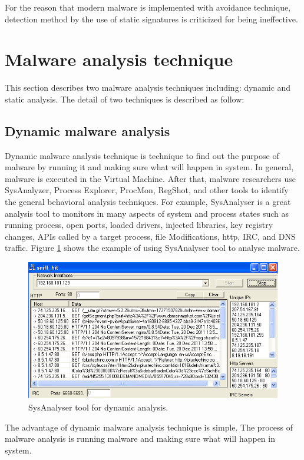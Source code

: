 For the reason that modern malware is implemented with avoidance technique, detection method by the use of static signatures is criticized for being ineffective.   
\section{Malware analysis technique}
This section describes two malware analysis techniques including: dynamic and static analysis. The detail of two techniques is described as follow: 
\subsection{Dynamic malware analysis}
Dynamic malware analysis technique is technique to find out the purpose of malware by running it and making sure what will happen in system. In general, malware is executed in the Virtual Machine. After that, malware researchers use SysAnalyzer, Process Explorer, ProcMon, RegShot, and other tools to identify the general behavioral analysis techniques. For example, SysAnalyser is a great analysis tool to monitors in many aspects of system and process states such as running process, open ports, loaded drivers, injected libraries, key registry changes, APIs called by a target process, file Modifications, http, IRC, and DNS traffic. Figure \ref{fig:SysAnalyser} shows the example of using SysAnalyser tool to analyse malware. 


\begin{figure}[h!]
\centering
\includegraphics[width=1\textwidth]{graph/SysAnalyser.png}
\caption{SysAnalyser tool for dynamic analysis.}
\label{fig:SysAnalyser}
\end{figure}

The advantage of dynamic malware analysis technique is simple. The process of malware analysis is running malware and making sure what will happen in 
system.

